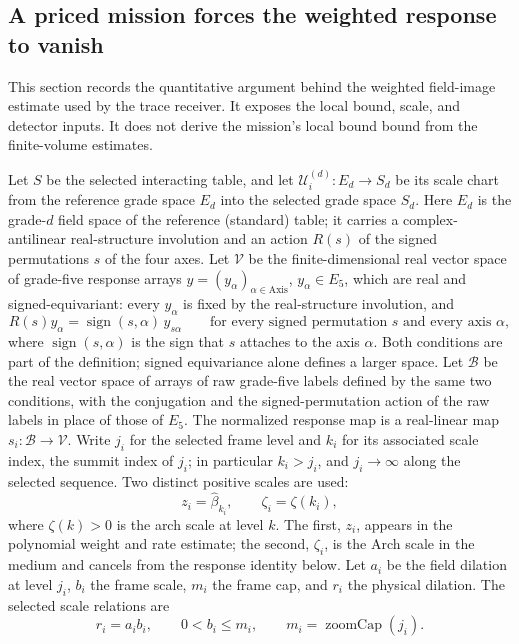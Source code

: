 \subsection{A priced mission forces the weighted response to vanish}
\label{subsec:ex-trace-small-means}

This section records the quantitative argument behind the weighted
field-image estimate used by the trace receiver. It exposes the local bound,
scale, and detector inputs. It does not derive the mission's local bound
bound from the finite-volume estimates.

Let $S$ be the selected interacting table, and let
$\mathcal U_i^{(d)}:E_d\to S_d$ be its scale chart from the reference grade
space $E_d$ into the selected grade space $S_d$. Here $E_d$ is the
grade-$d$ field space of the reference (standard) table; it carries a
complex-antilinear real-structure involution and an action $R(s)$ of the
signed permutations $s$ of the four axes. Let $\mathcal V$ be the
finite-dimensional real vector space of grade-five response arrays
$y=(y_\alpha)_{\alpha\in\mathrm{Axis}}$, $y_\alpha\in E_5$, which are
real and signed-equivariant: every $y_\alpha$ is fixed by the real-structure
involution, and
\[
 R(s)y_\alpha=\operatorname{sign}(s,\alpha)\,y_{s\alpha}
 \qquad\text{for every signed permutation }s\text{ and every axis }\alpha,
\]
where $\operatorname{sign}(s,\alpha)$ is the sign that $s$ attaches to
the axis $\alpha$. Both
conditions are part of the definition; signed equivariance alone defines a
larger space. Let $\mathcal B$ be the real vector space of arrays of raw
grade-five labels defined by the same two conditions, with the conjugation
and the signed-permutation action of the raw labels in place of those of
$E_5$. The normalized response map is a real-linear map
$s_i:\mathcal B\to\mathcal V$. Write $j_i$ for the
selected frame level and $k_i$ for its associated scale index, the summit
index of $j_i$; in particular $k_i>j_i$, and $j_i\to\infty$ along the
selected sequence. Two distinct positive scales are used:
\[
 z_i=\widehat\beta_{k_i},\qquad \zeta_i=\zeta(k_i),
\]
where $\zeta(k)>0$ is the arch scale at level $k$.
The first, $z_i$, appears in the polynomial weight and rate estimate; the
second, $\zeta_i$, is the Arch scale in the medium and cancels from the
response identity below. Let $a_i$ be the field dilation at level $j_i$,
$b_i$ the frame scale, $m_i$ the frame cap, and $r_i$ the physical dilation.
The selected scale relations are
\[
 r_i=a_ib_i,\qquad 0<b_i\leq m_i,
 \qquad m_i=\operatorname{zoomCap}(j_i).
\]
